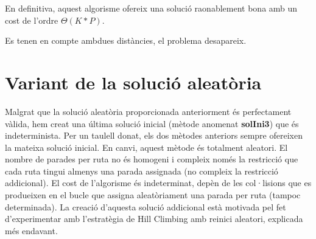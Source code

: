 En definitiva, aquest algorisme ofereix una solució raonablement bona amb un cost de l'ordre $\Theta(K * P)$.


 {Es tenen en compte ambdues distàncies, el problema desapareix.}

\section{Variant de la solució aleatòria}

Malgrat que la solució aleatòria proporcionada anteriorment és perfectament vàlida, hem creat una última solució inicial (mètode anomenat \textbf{solIni3}) que és indeterminista. Per un taulell donat, els dos mètodes anteriors sempre ofereixen la mateixa solució inicial. En canvi, aquest mètode és totalment aleatori. El nombre de parades per ruta no és homogeni i compleix només la restricció que cada ruta tingui almenys una parada assignada (no compleix la restricció addicional). El cost de l'algorisme és indeterminat, depèn de les col·lisions que es produeixen en el bucle que assigna aleatòriament una parada per ruta (tampoc determinada). La creació d'aquesta solució addicional està motivada pel fet d'experimentar amb l'estratègia de Hill Climbing amb reinici aleatori, explicada més endavant.

